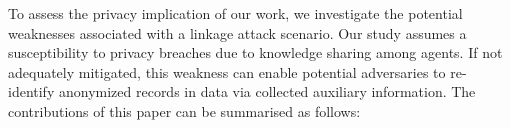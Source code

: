 \documentclass{article}
\begin{document}
To assess the privacy implication of our work, we investigate the potential weaknesses associated with a linkage attack scenario. Our study assumes a susceptibility to privacy breaches due to knowledge sharing among agents. If not adequately mitigated, this weakness can enable potential adversaries to re-identify anonymized records in data via collected auxiliary information.
%
%
%
%
The contributions of this paper can be summarised as follows:
\end{document}
